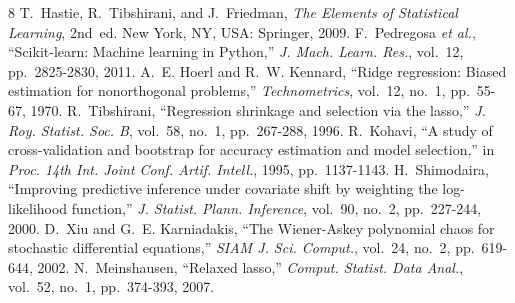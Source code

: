 \documentclass[conference]{IEEEtran}
\begin{document}
\begin{thebibliography}{8}
 T.~Hastie, R.~Tibshirani, and J.~Friedman, \emph{The Elements of Statistical Learning}, 2nd~ed. New York, NY, USA: Springer, 2009.
 F.~Pedregosa \emph{et al.}, ``Scikit-learn: Machine learning in Python,'' \emph{J. Mach. Learn. Res.}, vol.~12, pp.~2825-2830, 2011.
 A.~E. Hoerl and R.~W. Kennard, ``Ridge regression: Biased estimation for nonorthogonal problems,'' \emph{Technometrics}, vol.~12, no.~1, pp.~55-67, 1970.
 R.~Tibshirani, ``Regression shrinkage and selection via the lasso,'' \emph{J. Roy. Statist. Soc. B}, vol.~58, no.~1, pp.~267-288, 1996.
 R.~Kohavi, ``A study of cross-validation and bootstrap for accuracy estimation and model selection,'' in \emph{Proc. 14th Int. Joint Conf. Artif. Intell.}, 1995, pp.~1137-1143.
 H.~Shimodaira, ``Improving predictive inference under covariate shift by weighting the log-likelihood function,'' \emph{J. Statist. Plann. Inference}, vol.~90, no.~2, pp.~227-244, 2000.
 D.~Xiu and G.~E. Karniadakis, ``The Wiener-Askey polynomial chaos for stochastic differential equations,'' \emph{SIAM J. Sci. Comput.}, vol.~24, no.~2, pp.~619-644, 2002.
 N.~Meinshausen, ``Relaxed lasso,'' \emph{Comput. Statist. Data Anal.}, vol.~52, no.~1, pp.~374-393, 2007.
\end{thebibliography}
\end{document}
